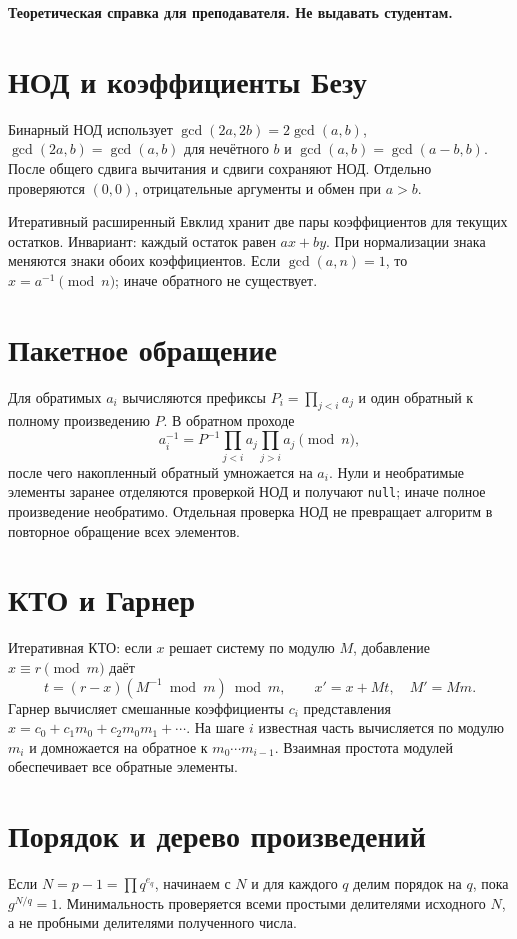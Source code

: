 \documentclass[12pt]{ca-capstone}
\begin{document}
\begin{center}\textbf{Теоретическая справка для преподавателя. Не выдавать студентам.}\end{center}

\section{НОД и коэффициенты Безу}
Бинарный НОД использует $\gcd(2a,2b)=2\gcd(a,b)$, $\gcd(2a,b)=\gcd(a,b)$ для нечётного $b$ и
$\gcd(a,b)=\gcd(a-b,b)$. После общего сдвига вычитания и сдвиги сохраняют НОД. Отдельно
проверяются $(0,0)$, отрицательные аргументы и обмен при $a>b$.

Итеративный расширенный Евклид хранит две пары коэффициентов для текущих остатков. Инвариант:
каждый остаток равен $ax+by$. При нормализации знака меняются знаки обоих коэффициентов. Если
$\gcd(a,n)=1$, то $x=a^{-1}\pmod n$; иначе обратного не существует.

\section{Пакетное обращение}
Для обратимых $a_i$ вычисляются префиксы $P_i=\prod_{j<i}a_j$ и один обратный к полному
произведению $P$. В обратном проходе
\[
 a_i^{-1}=P^{-1}\prod_{j<i}a_j\prod_{j>i}a_j \pmod n,
\]
после чего накопленный обратный умножается на $a_i$. Нули и необратимые элементы заранее
отделяются проверкой НОД и получают \texttt{null}; иначе полное произведение необратимо.
Отдельная проверка НОД не превращает алгоритм в повторное обращение всех элементов.

\section{КТО и Гарнер}
Итеративная КТО: если $x$ решает систему по модулю $M$, добавление $x\equiv r\pmod m$ даёт
\[
 t=(r-x)(M^{-1}\bmod m)\bmod m,\qquad x'=x+Mt,\quad M'=Mm.
\]
Гарнер вычисляет смешанные коэффициенты $c_i$ представления
$x=c_0+c_1m_0+c_2m_0m_1+\cdots$. На шаге $i$ известная часть вычисляется по модулю $m_i$ и
домножается на обратное к $m_0\cdots m_{i-1}$. Взаимная простота модулей обеспечивает все
обратные элементы.

\section{Порядок и дерево произведений}
Если $N=p-1=\prod q^{e_q}$, начинаем с $N$ и для каждого $q$ делим порядок на $q$, пока
$g^{N/q}=1$. Минимальность проверяется всеми простыми делителями исходного $N$, а не пробными
делителями полученного числа.
\end{document}
